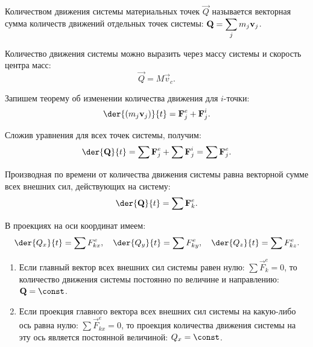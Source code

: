
Количеством движения системы материальных точек \( \vec{Q} \) называется
векторная сумма количеств движений отдельных точек системы:
\( \displaystyle \boldsymbol{\mathrm{Q}} = \sum_j m_j\boldsymbol{\mathrm{v}}_j \).

Количество движения системы можно выразить через массу системы и скорость центра масс:
\[
    \vec{Q} = M\vec{v}_c.
\]

Запишем теорему об изменении количества движения для \( i \)-точки:
\[
    \der{(m_j\vec{v}_j)}{t} = \vec{F}^e_j + \vec{F}^i_j.
\]

Сложив уравнения для всех точек системы, получим:
\[
    \der{\vec{Q}}{t} = \sum \vec{F}^e_j + \sum \vec{F}^i_j = \sum \vec{F}^e_j.
\]

Производная по времени от количества движения системы равна векторной сумме всех
внешних сил, действующих на систему:
\[
    \der{\vec{Q}}{t} = \sum \vec{F}^e_k.
\]

В проекциях на оси координат имеем:
\[
    \der{Q_x}{t} = \sum F^e_{kx}, \quad \der{Q_y}{t} = \sum F^e_{ky}, \quad
    \der{Q_z}{t} = \sum F^e_{kz}.
\]

\begin{enumerate}
    \item Если главный вектор всех внешних сил системы равен нулю:
    \( \sum \vec{F}^e_k = 0 \), то количество движения системы постоянно по
    величине и направлению: \( \vec{Q} = \const \).
    \item Если проекция главного вектора всех внешних сил системы на какую-либо
    ось равна нулю: \( \sum \vec{F}^e_{kx} = 0 \), то проекция количества
    движения системы на эту ось является постоянной величиной:
    \( Q_x = \const \).
\end{enumerate}

\newpage
